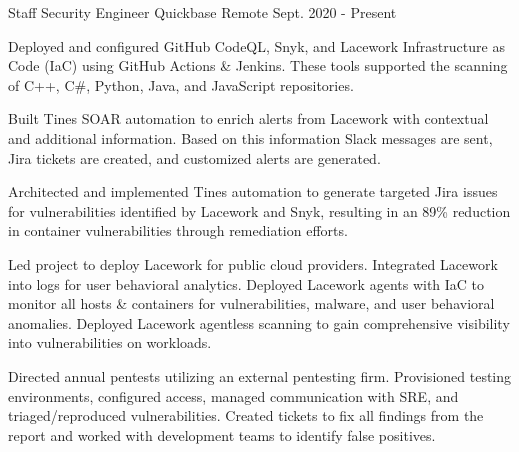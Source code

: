 

\begin{cventries}
\vspace{-3mm}
  \cventry
    {Staff Security Engineer} %
    {Quickbase} %
    {Remote} %
    {Sept. 2020 - Present} %
    {
      \begin{cvitems} %
        \item {
          Deployed and configured GitHub CodeQL, Snyk, and Lacework Infrastructure as Code (IaC) using GitHub Actions \& Jenkins. These tools supported the scanning of C++, C\#, Python, Java, and JavaScript repositories.
        }
        \item {
          Built Tines SOAR automation to enrich alerts from Lacework with contextual and additional information. Based on this information Slack messages are sent, Jira tickets are created, and customized alerts are generated.
        }
        \item {
          Architected and implemented Tines automation to generate targeted Jira issues for vulnerabilities identified by Lacework and Snyk, resulting in an 89\% reduction in container vulnerabilities through remediation efforts.
        }
        \item {
          Led project to deploy Lacework for public cloud providers. Integrated Lacework into logs for user behavioral analytics. Deployed Lacework agents with IaC to monitor all hosts \& containers for vulnerabilities, malware, and user behavioral\\ anomalies. Deployed Lacework agentless scanning to gain comprehensive visibility into vulnerabilities on workloads.
        }
        \item {
          Directed annual pentests utilizing an external pentesting firm. Provisioned testing environments, configured access, managed communication with SRE, and triaged/reproduced vulnerabilities. Created tickets to fix all findings from the report and worked with development teams to identify false positives.
}
\end{cvitems}}
\end{cventries}
